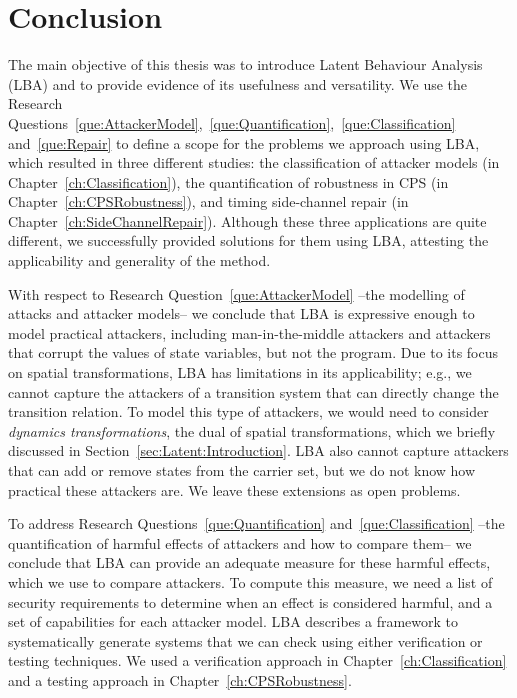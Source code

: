 \chapter{Conclusion}
The main objective of this thesis was to introduce Latent Behaviour Analysis (LBA) and to provide evidence of its usefulness and versatility. We use the Research Questions~\ref{que:AttackerModel},~\ref{que:Quantification},~\ref{que:Classification} and~\ref{que:Repair} to define a scope for the problems we approach using LBA, which resulted in three different studies: the classification of attacker models (in Chapter~\ref{ch:Classification}), the quantification of robustness in CPS (in Chapter~\ref{ch:CPSRobustness}), and timing side-channel repair (in Chapter~\ref{ch:SideChannelRepair}). Although these three applications are quite different, we successfully provided solutions for them using LBA, attesting the applicability and generality of the method. 

With respect to Research Question~\ref{que:AttackerModel} --the modelling of attacks and attacker models-- we conclude that LBA is expressive enough to model practical attackers, including man-in-the-middle attackers and attackers that corrupt the values of state variables, but not the program. Due to its focus on spatial transformations, LBA has limitations in its applicability; e.g., we cannot capture the attackers of a transition system that can directly change the transition relation. To model this type of attackers, we would need to consider \emph{dynamics transformations}, the dual of spatial transformations, which we briefly discussed in Section~\ref{sec:Latent:Introduction}. LBA also cannot capture attackers that can add or remove states from the carrier set, but we do not know how practical these attackers are. We leave these extensions as open problems. 

To address Research Questions~\ref{que:Quantification} and~\ref{que:Classification} --the quantification of harmful effects of attackers and how to compare them-- we conclude that LBA can provide an adequate measure for these harmful effects, which we use to compare attackers. To compute this measure, we need a list of security requirements to determine when an effect is considered harmful, and a set of capabilities for each attacker model. LBA describes a framework to systematically generate systems that we can check using either verification or testing techniques. We used a verification approach in Chapter~\ref{ch:Classification} and a testing approach in Chapter~\ref{ch:CPSRobustness}. 

